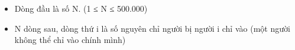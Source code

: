 \begin{itemize}
	\item     Dòng đầu là số N. (1 ≤ N ≤ 500.000)   
	\item     N dòng sau, dòng thứ i là số nguyên chỉ người bị người i chỉ vào (một người không thể chỉ vào chính mình)   
\end{itemize}

\